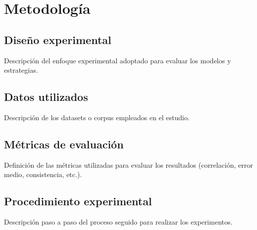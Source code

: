 \chapter{Metodología}

\section{Diseño experimental}
Descripción del enfoque experimental adoptado para evaluar los modelos y estrategias.

\section{Datos utilizados}
Descripción de los datasets o corpus empleados en el estudio.

\section{Métricas de evaluación}
Definición de las métricas utilizadas para evaluar los resultados (correlación, error medio, consistencia, etc.).

\section{Procedimiento experimental}
Descripción paso a paso del proceso seguido para realizar los experimentos.